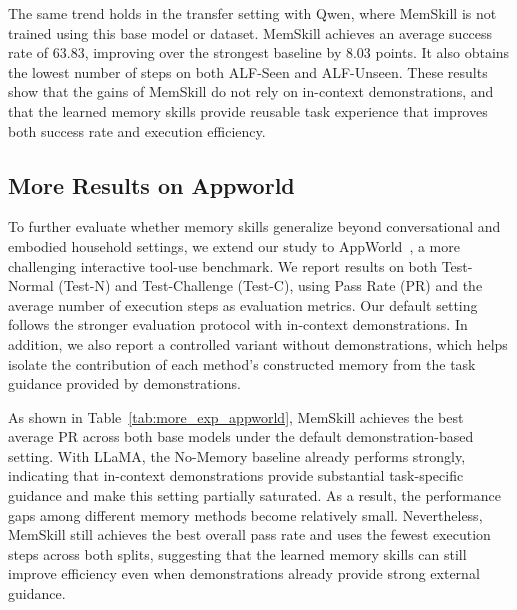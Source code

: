 The same trend holds in the transfer setting with Qwen, where MemSkill is not trained using this base model or dataset. MemSkill achieves an average success rate of 63.83, improving over the strongest baseline by 8.03 points. It also obtains the lowest number of steps on both ALF-Seen and ALF-Unseen. These results show that the gains of MemSkill do not rely on in-context demonstrations, and that the learned memory skills provide reusable task experience that improves both success rate and execution efficiency.











\subsection{More Results on Appworld}
\label{appendix:more_exp_appworld}







To further evaluate whether memory skills generalize beyond conversational and embodied household settings, we extend our study to AppWorld~\citep{trivedi2024appworld}, a more challenging interactive tool-use benchmark. We report results on both Test-Normal (Test-N) and Test-Challenge (Test-C), using Pass Rate (PR) and the average number of execution steps as evaluation metrics. Our default setting follows the stronger evaluation protocol with in-context demonstrations. In addition, we also report a controlled variant without demonstrations, which helps isolate the contribution of each method's constructed memory from the task guidance provided by demonstrations.

As shown in Table~\ref{tab:more_exp_appworld}, MemSkill achieves the best average PR across both base models under the default demonstration-based setting. With LLaMA, the No-Memory baseline already performs strongly, indicating that in-context demonstrations provide substantial task-specific guidance and make this setting partially saturated. As a result, the performance gaps among different memory methods become relatively small. Nevertheless, MemSkill still achieves the best overall pass rate and uses the fewest execution steps across both splits, suggesting that the learned memory skills can still improve efficiency even when demonstrations already provide strong external guidance.

